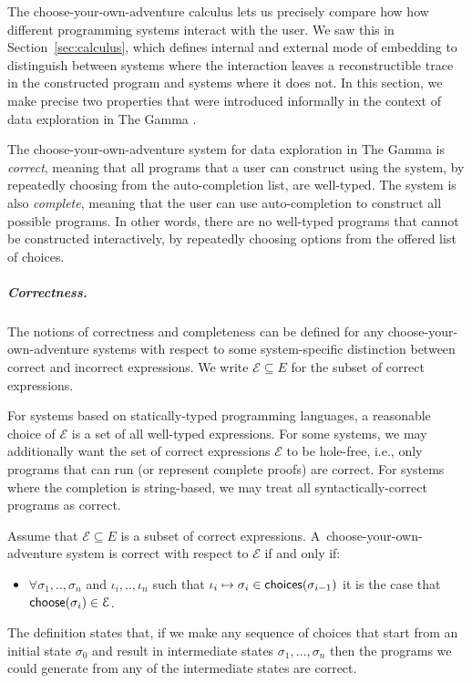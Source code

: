 \documentclass[a4paper,UKenglish,cleveref, autoref, thm-restate]{lipics-v2021}
\newcommand{\ident}[1]{\textsf{#1}}
\newcommand{\select}{\textnormal{\ident{choose}}}
\newcommand{\choices}{\textnormal{\ident{choices}}}
\begin{document}
The choose-your-own-adventure calculus lets us precisely compare how how different
programming systems interact with the user. We saw this in Section~\ref{sec:calculus}, which
defines internal and external mode of embedding to distinguish between systems where the
interaction leaves a reconstructible trace in the constructed program and systems where it does not.
In this section, we make precise two properties that were introduced informally in the context of
data exploration in The Gamma \cite{petricek-2022-thegamma}.

The choose-your-own-adventure system for data exploration in The Gamma is \emph{correct}, meaning that
all programs that a user can construct using the system, by repeatedly choosing from the
auto-completion list, are well-typed. The system is also \emph{complete}, meaning that the user can
use auto-completion to construct all possible programs. In other words, there are no well-typed programs
that cannot be constructed interactively, by repeatedly choosing options from the offered list of
choices.

\subparagraph{Correctness.}
The notions of correctness and completeness can be defined for any
choose-your-own-adventure systems with respect to some system-specific distinction between
correct and incorrect expressions. We write $\mathcal{E} \subseteq E$ for the subset
of correct expressions.

For systems based on statically-typed programming languages, a reasonable choice of $\mathcal{E}$
is a set of all well-typed expressions. For some systems, we may additionally want the set
of correct expressions $\mathcal{E}$ to be hole-free, i.e., only programs that can run (or
represent complete proofs) are correct. For systems where the completion is string-based,
we may treat all syntactically-correct programs as correct.


\begin{definition}[Correctness]
Assume that $\mathcal{E}\subseteq E$ is a subset of correct expressions.
A~choose-your-own-adventure system is correct with respect to $\mathcal{E}$ if and only if:
\begin{itemize}
\item $\forall \sigma_1,..,\sigma_n$ and $\iota_i,..,\iota_n$ such that
  $\iota_i\mapsto\sigma_i \in \choices(\sigma_{i-1})$ it is the case
that $\select(\sigma_i) \in \mathcal{E}$.
\end{itemize}
\end{definition}

The definition states that, if we make any sequence of choices that start from an initial state
$\sigma_0$ and result in intermediate states $\sigma_1, \ldots, \sigma_n$ then the programs
we could generate from any of the intermediate states are correct.
\end{document}
